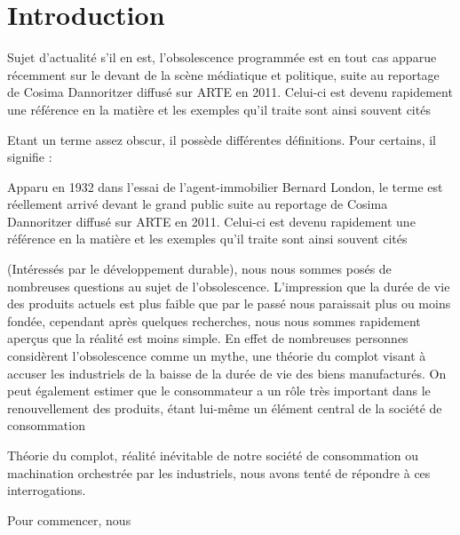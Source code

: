 \chapter*{Introduction}

 Sujet d'actualité s'il en est, l'obsolescence programmée est en tout cas apparue récemment sur le devant de la scène médiatique et politique, suite au reportage de Cosima Dannoritzer diffusé sur ARTE en 2011. Celui-ci est devenu rapidement une référence en la matière et les exemples qu'il traite sont ainsi souvent cités


Etant un terme assez obscur, il possède différentes définitions. Pour certains, il signifie : 


Apparu en 1932 dans l'essai de l'agent-immobilier Bernard London, le terme est réellement arrivé devant le grand public suite au reportage de Cosima Dannoritzer diffusé sur ARTE en 2011. Celui-ci est devenu rapidement une référence en la matière et les exemples qu'il traite sont ainsi souvent cités


(Intéressés par le développement durable), nous nous sommes posés de nombreuses questions au sujet de l'obsolescence. L'impression que la durée de vie des produits actuels est plus faible que par le passé nous paraissait plus ou moins fondée, cependant après quelques recherches, nous nous sommes rapidement aperçus que la réalité est moins simple. En effet de nombreuses personnes considèrent l'obsolescence comme un mythe, une théorie du complot visant à accuser les industriels de la baisse de la durée de vie des biens manufacturés. On peut également estimer que le consommateur a un rôle très important dans le renouvellement des produits, étant lui-même un élément central de la société de consommation


Théorie du complot, réalité inévitable de notre société de consommation ou machination orchestrée par les industriels, nous avons tenté de répondre à ces interrogations.


Pour commencer, nous 

